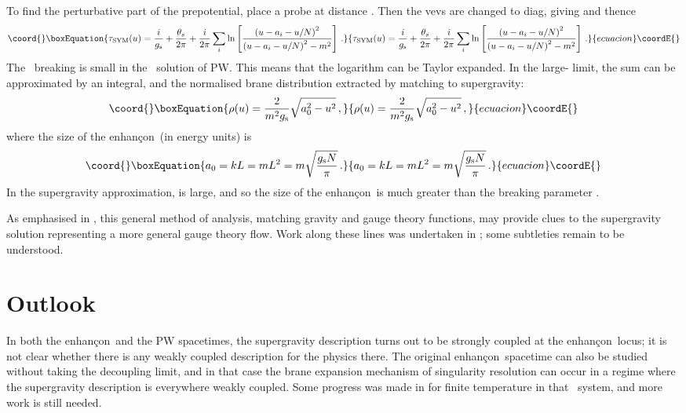 \documentclass[a4paper,12pt]{amsproc}
\numberwithin{equation}{section}
\def\gs{g_{\rm{s}}}
\def\enh{enhan\c con}
\def\nef{\myHighlight{$n{=}4$}\coordHE{}}
\def\net{\myHighlight{$n{=}2$}\coordHE{}}
\def\nets{\myHighlight{$n{=}2*$}\coordHE{}}
\begin{document}
To find the perturbative part of the prepotential, place a probe at
distance \coordHE{}.  Then the vevs are changed to
diag\coordHE{}, giving \coordHE{} and thence
%
\begin{equation}\coord{}\boxEquation{
\tau_{\rm SYM}(u)= {{i}\over{\gs}} + {{\theta_s}\over{2\pi}}
+ {{i}\over{2\pi}} \sum_i \ln\left[ 
{{\left(u-a_i-u/N\right)^2}\over{\left(u-a_i-u/N\right)^2-m^2}}
\right] \,.
}{
\tau_{\rm SYM}(u)= {{i}\over{\gs}} + {{\theta_s}\over{2\pi}}
+ {{i}\over{2\pi}} \sum_i \ln\left[ 
{{\left(u-a_i-u/N\right)^2}\over{\left(u-a_i-u/N\right)^2-m^2}}
\right] \,.
}{ecuacion}\coordE{}\end{equation}
%
The \nef\ breaking is small in the \nets\ solution of PW.  This means
that the logarithm can be Taylor expanded.  In the large-\coordHE{} limit,
the sum can be approximated by an integral, and the normalised brane
distribution extracted by matching to supergravity:
%
\begin{equation}\coord{}\boxEquation{
\rho(u) = {{2}\over{m^2\gs}}\sqrt{a_0^2-u^2} \,,
}{
\rho(u) = {{2}\over{m^2\gs}}\sqrt{a_0^2-u^2} \,,
}{ecuacion}\coordE{}\end{equation}
%
where the size of the \enh\ (in energy units) is
%
\begin{equation}\coord{}\boxEquation{
a_0=kL=mL^2=m\sqrt{{\gs N}\over{\pi}} \,.
}{
a_0=kL=mL^2=m\sqrt{{\gs N}\over{\pi}} \,.
}{ecuacion}\coordE{}\end{equation}
%
In the supergravity approximation, \myHighlight{$\gs N$}\coordHE{} is large, and so the size
of the \enh\ is much greater than the breaking parameter \coordHE{}.  

As emphasised in \cite{bpp}, this general method of analysis, matching
gravity and gauge theory \myHighlight{$\tau$}\coordHE{} functions, may provide clues to the
supergravity solution representing a more general gauge theory flow.
Work along these lines was undertaken in \cite{evansplus2}; some
subtleties remain to be understood.


%

%
%

%

%
%
%
\section{Outlook}

In both the \enh\ and the PW spacetimes, the supergravity description
turns out to be strongly coupled at the \enh\ locus; it is not clear
whether there is any weakly coupled description for the physics there.
The original \enh\ spacetime can also be studied without taking the
decoupling limit, and in that case the brane expansion mechanism of
singularity resolution can occur in a regime where the supergravity
description is everywhere weakly coupled.  Some progress was made in
\cite{jmpr} for finite temperature in that \net\ system, and more work
is still needed.
\end{document}
